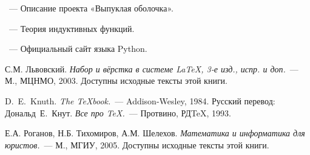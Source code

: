 \begin{thebibliography}{}

~---
Описание проекта «Выпуклая оболочка».

~---
Теория индуктивных функций.

~---
Официальный сайт языка Python.

С.М. Львовский.
{\em Набор и вёрстка в системе \LaTeX, 3-е изд., испр. и доп.}~---
М., МЦНМО, 2003. Доступны исходные тексты этой книги.

D.~E.~Knuth. {\em The \TeX{}book.}~---
Addison-Wesley, 1984. Русский перевод:
Дональд~Е.~Кнут.
{\em Все про \TeX.}~--- Протвино, РД\TeX, 1993.

Е.А. Роганов, Н.Б. Тихомиров, А.М. Шелехов.
{\em Математика и информатика для юристов.}~---
М., МГИУ, 2005.
Доступны исходные тексты этой книги.

\end{thebibliography}
